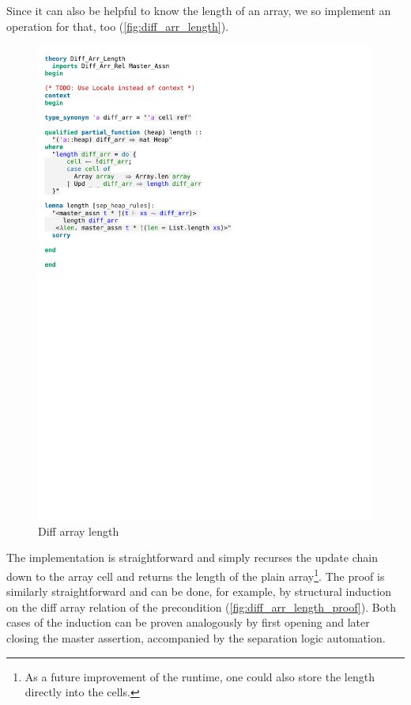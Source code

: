 Since it can also be helpful to know the length of an array, we so implement an operation for that, too (\autoref{fig:diff_arr_length}).

\begin{figure}[htpb]
    \includegraphics[trim={0 20,2cm 0 5,2cm}, clip, width=1.00\textwidth]{figures/Theory_Diff_Arr_Length.pdf}
    \caption[Diff array length]{Diff array length}
    \label{fig:diff_arr_length}
\end{figure}

\noindent The implementation is straightforward and simply recurses the update chain down to the array cell and returns the length of the plain array\footnote{As a future improvement of the runtime, one could also store the length directly into the cells.}. The proof is similarly straightforward and can be done, for example, by structural induction on the diff array relation of the precondition (\autoref{fig:diff_arr_length_proof}). Both cases of the induction can be proven analogously by first opening and later closing the master assertion, accompanied by the separation logic automation.

